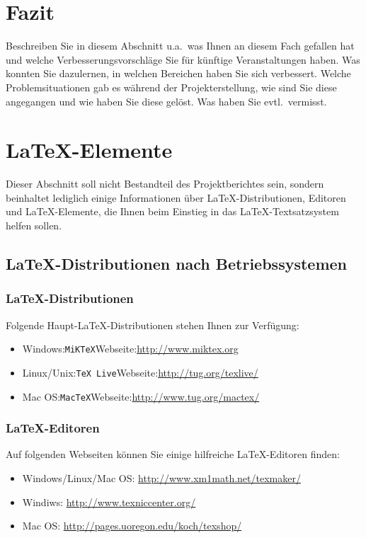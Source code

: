 \documentclass[12pt,a4paper]{article}
\begin{document}
\newpage
\section{Fazit}
Beschreiben Sie in diesem Abschnitt u.a.\ was Ihnen an diesem Fach gefallen hat und welche Verbesserungsvorschläge Sie für künftige Veranstaltungen haben. Was konnten Sie dazulernen, in welchen Bereichen haben Sie sich verbessert. Welche Problemsituationen gab es während der Projekterstellung, wie sind Sie diese angegangen und wie haben Sie diese gelöst. Was haben Sie evtl.\ vermisst.


\newpage
\section{\LaTeX-Elemente}
Dieser Abschnitt soll nicht Bestandteil des Projektberichtes sein, sondern beinhaltet lediglich einige Informationen über \LaTeX-Distributionen, Editoren und \LaTeX-Elemente, die Ihnen beim Einstieg in das \LaTeX-Textsatzsystem helfen sollen.

\subsection{\LaTeX-Distributionen nach Betriebssystemen}

\subsubsection{\LaTeX-Distributionen}
Folgende Haupt-\LaTeX-Distributionen stehen Ihnen zur Verfügung:
\begin{itemize}
  \item Windows:\quad \texttt{MiKTeX}\quad Webseite:\quad\url{http://www.miktex.org}
  \item Linux/Unix:\quad \texttt{TeX Live}\quad Webseite:\quad\url{http://tug.org/texlive/}
  \item Mac OS:\quad \texttt{MacTeX}\quad Webseite:\quad\url{http://www.tug.org/mactex/}
\end{itemize}

\subsubsection{\LaTeX-Editoren}
Auf folgenden Webseiten können Sie einige hilfreiche \LaTeX-Editoren finden:
\begin{itemize}
  \item Windows/Linux/Mac OS: \url{http://www.xm1math.net/texmaker/}
  \item Windiws: \url{http://www.texniccenter.org/}
  \item Mac OS: \url{http://pages.uoregon.edu/koch/texshop/}
\end{itemize}
\end{document}
